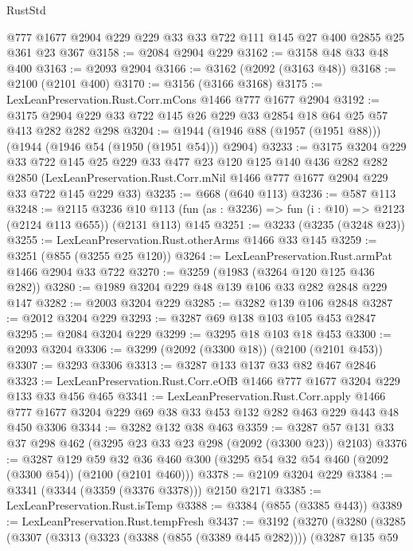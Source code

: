 \begin{lexlean}{RustStd}
\begin{coremodule}
    @777
    @1677
    @2904
    @229
    @229
    @33
    @33
    @722
    @111
    @145
    @27
    @400
    @2855
    @25
    @361
    @23
    @367
@3158 := @2084 @2904 @229
@3162 := @3158 @48 @33 @48 @400
@3163 := @2093 @2904
@3166 := @3162 (@2092 (@3163 @48))
@3168 := @2100 (@2101 @400)
@3170 := @3156 (@3166 @3168)
@3175 := LexLeanPreservation.Rust.Corr.mCons @1466 @777 @1677 @2904
@3192 := @3175 @2904 @229 @33 @722 @145 @26 @229 @33 @2854 @18 @64 @25 @57 @413 @282 @282 @298
@3204 := @1944 (@1946 @88 (@1957 (@1951 @88))) (@1944 (@1946 @54 (@1950 (@1951 @54))) @2904)
@3233 := @3175
    @3204
    @229
    @33
    @722
    @145
    @25
    @229
    @33
    @477
    @23
    @120
    @125
    @140
    @436
    @282
    @282
    @2850
    (LexLeanPreservation.Rust.Corr.mNil @1466 @777 @1677 @2904 @229 @33 @722 @145 @229 @33)
@3235 := @668 (@640 @113)
@3236 := @587 @113
@3248 := @2115
    @3236
    @10
    @113
    (fun (as : @3236) => fun (i : @10) => @2123 (@2124 @113 @655))
    (@2131 @113)
    @145
@3251 := @3233 (@3235 (@3248 @23))
@3255 := LexLeanPreservation.Rust.otherArms @1466 @33 @145
@3259 := @3251 (@855 (@3255 @25 @120))
@3264 := LexLeanPreservation.Rust.armPat @1466 @2904 @33 @722
@3270 := @3259 (@1983 (@3264 @120 @125 @436 @282))
@3280 := @1989 @3204 @229 @48 @139 @106 @33 @282 @2848 @229 @147
@3282 := @2003 @3204 @229
@3285 := @3282 @139 @106 @2848
@3287 := @2012 @3204 @229
@3293 := @3287 @69 @138 @103 @105 @453 @2847
@3295 := @2084 @3204 @229
@3299 := @3295 @18 @103 @18 @453
@3300 := @2093 @3204
@3306 := @3299 (@2092 (@3300 @18)) (@2100 (@2101 @453))
@3307 := @3293 @3306
@3313 := @3287 @133 @137 @33 @82 @467 @2846
@3323 := LexLeanPreservation.Rust.Corr.eOfB @1466 @777 @1677 @3204 @229 @133 @33 @456 @465
@3341 := LexLeanPreservation.Rust.Corr.apply
    @1466
    @777
    @1677
    @3204
    @229
    @69
    @38
    @33
    @453
    @132
    @282
    @463
    @229
    @443
    @48
    @450
    @3306
@3344 := @3282 @132 @38 @463
@3359 := @3287 @57 @131 @33 @37 @298 @462 (@3295 @23 @33 @23 @298 (@2092 (@3300 @23)) @2103)
@3376 := @3287
    @129
    @59
    @32
    @36
    @460
    @300
    (@3295 @54 @32 @54 @460 (@2092 (@3300 @54)) (@2100 (@2101 @460)))
@3378 := @2109 @3204 @229
@3384 := @3341 (@3344 (@3359 (@3376 @3378))) @2150 @2171
@3385 := LexLeanPreservation.Rust.isTemp
@3388 := @3384 (@855 (@3385 @443))
@3389 := LexLeanPreservation.Rust.tempFresh
@3437 := @3192
    (@3270
      (@3280
        (@3285
          (@3307
            (@3313
              (@3323 (@3388 (@855 (@3389 @445 @282))))
              (@3287
                @135
                @59

\end{coremodule}
\end{lexlean}
